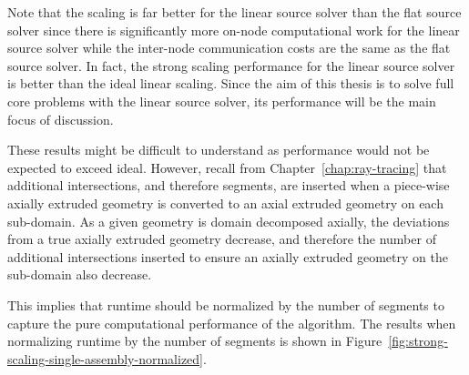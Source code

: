 Note that the scaling is far better for the linear source solver than the flat source solver since there is significantly more on-node computational work for the linear source solver while the inter-node communication costs are the same as the flat source solver. In fact, the strong scaling performance for the linear source solver is better than the ideal linear scaling. Since the aim of this thesis is to solve full core problems with the linear source solver, its performance will be the main focus of discussion.

These results might be difficult to understand as performance would not be expected to exceed ideal. However, recall from Chapter~\ref{chap:ray-tracing} that additional intersections, and therefore segments, are inserted when a piece-wise axially extruded geometry is converted to an axial extruded geometry on each sub-domain. As a given geometry is domain decomposed axially, the deviations from a true axially extruded geometry decrease, and therefore the number of additional intersections inserted to ensure an axially extruded geometry on the sub-domain also decrease.

This implies that runtime should be normalized by the number of segments to capture the pure computational performance of the algorithm. The results when normalizing runtime by the number of segments is shown in Figure~\ref{fig:strong-scaling-single-assembly-normalized}. 

